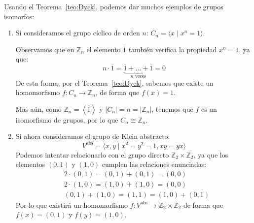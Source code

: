 \begin{ejemplo}
    Usando el Teorema~\ref{teo:Dyck}, podemos dar muchos ejemplos de grupos isomorfos:
    \begin{enumerate}
        \item Si consideramos el grupo cíclico de orden $n$: $C_n = \langle x \mid x^n = 1 \rangle $.

            Observamos que en $\mathbb{Z}_n$ el elemento $\overline{1}$ también verifica la propiedad $x^n = 1$, ya que:
            \begin{equation*}
                n\cdot \overline{1} = \underbrace{\overline{1} + \ldots + \overline{1}}_{n \text{\ veces}} = 0
            \end{equation*}
            De esta forma, por el Teorema~\ref{teo:Dyck}, sabemos que existe un homomorfismo $f:C_n\to \mathbb{Z}_n$, de forma que $f(x) = 1$.

            Más aún, como $\mathbb{Z}_n = \left\langle \overline{1} \right\rangle $ y $|C_n| = n = |\mathbb{Z}_n|$, tenemos que $f$ es un isomorfismo de grupos, por lo que $C_n\cong \mathbb{Z}_n$.
        \item Si ahora consideramos el grupo de Klein abstracto:
            \begin{equation*}
                V^{\text{abs}} = \langle x,y \mid x^2=y^2=1, xy=yx \rangle 
            \end{equation*}
            Podemos intentar relacionarlo con el grupo directo $\mathbb{Z}_2\times\mathbb{Z}_2$, ya que los elementos $(0,1)$ y $(1,0)$ cumplen las relaciones enunciadas:
            \begin{align*}
                &2\cdot (0, 1) = (0, 1) + (0, 1) = (0, 0) \\
                &2\cdot (1, 0) = (1, 0) + (1, 0) = (0, 0) \\
                &(0, 1) + (1, 0) = (1, 1) = (1, 0) + (0, 1)
            \end{align*}
            Por lo que existirá un homomorfismo $f:V^{\text{abs}}\to\mathbb{Z}_2\times\mathbb{Z}_2$ de forma que $f(x) = (0, 1)$ y $f(y) = (1, 0)$.


\end{enumerate}
\end{ejemplo}
